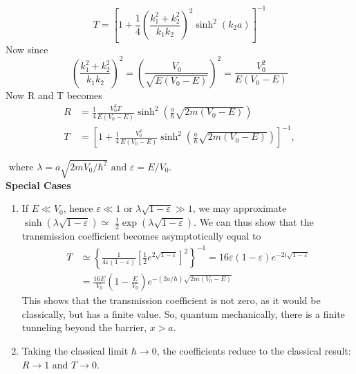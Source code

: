 $$T=\left[1+\frac{1}{4}\left(\frac{k_{1}^{2}+k_{2}^{2}}{k_{1} k_{2}}\right)^{2} \sinh ^{2}\left(k_{2} a\right)\right]^{-1} $$
Now since
$$
\left(\frac{k_{1}^{2}+k_{2}^{2}}{k_{1} k_{2}}\right)^{2}=\left(\frac{V_{0}}{\sqrt{E\left(V_{0}-E\right)}}\right)^{2}=\frac{V_{0}^{2}}{E\left(V_{0}-E\right)}
$$
Now R and T becomes\\
$$\begin{aligned}
	R &=\frac{1}{4} \frac{V_{0}^{2} T}{E\left(V_{0}-E\right)} \sinh ^{2}\left(\frac{a}{\hbar} \sqrt{2 m\left(V_{0}-E\right)}\right) \\
	T &=\left[1+\frac{1}{4} \frac{V_{0}^{2}}{E\left(V_{0}-E\right)} \sinh ^{2}\left(\frac{a}{\hbar} \sqrt{2 m\left(V_{0}-E\right)}\right)\right]^{-1},
\end{aligned}$$
\begin{center}
\end{center}
$\text { where } \lambda=a \sqrt{2 m V_{0} / \hbar^{2}} \text { and } \varepsilon=E / V_{0} \text {. }$\\
\textbf{Special Cases}
\begin{enumerate}
	\item  If $E \ll V_{0}$, hence $\varepsilon \ll 1$ or $\lambda \sqrt{1-\varepsilon} \gg 1$, we may approximate $\sinh (\lambda \sqrt{1-\varepsilon}) \simeq$ $\frac{1}{2} \exp (\lambda \sqrt{1-\varepsilon})$. We can thus show that the transmission coefficient becomes asymptotically equal to
	$$
	\begin{aligned}
	T & \simeq\left\{\frac{1}{4 \varepsilon(1-\varepsilon)}\left[\frac{1}{2} e^{2 \sqrt{1-\varepsilon}}\right]^{2}\right\}^{-1}=16 \varepsilon(1-\varepsilon) e^{-2 i \sqrt{1-\varepsilon}} \\
	&=\frac{16 E}{V_{0}}\left(1-\frac{E}{V_{0}}\right) e^{-(2 a / \hbar) \sqrt{2 m\left(V_{0}-E\right)}}
	\end{aligned}
	$$
	This shows that the transmission coefficient is not zero, as it would be classically, but has a finite value. So, quantum mechanically, there is a finite tunneling beyond the barrier, $x>a$.
	\item Taking the classical limit $\hbar \rightarrow 0$, the coefficients reduce to the classical result: $R \rightarrow 1$ and $T \rightarrow 0$.
\end{enumerate}
